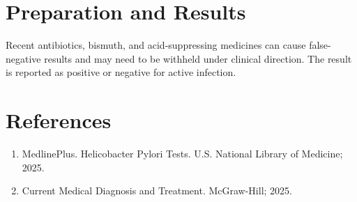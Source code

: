 \section*{Preparation and Results}
Recent antibiotics, bismuth, and acid-suppressing medicines can cause false-negative results and may need to be withheld under clinical direction. The result is reported as positive or negative for active infection.

\section*{References}
\begin{enumerate}
  \item MedlinePlus. Helicobacter Pylori Tests. U.S. National Library of Medicine; 2025.
  \item Current Medical Diagnosis and Treatment. McGraw-Hill; 2025.
\end{enumerate}
\clearpage
